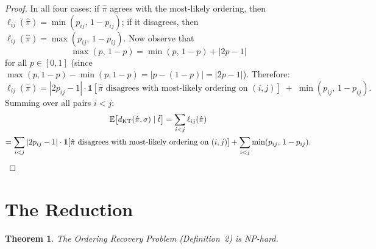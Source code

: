 \documentclass[11pt]{article}
\newtheorem{theorem}[lemma]{Theorem}
\begin{document}
\begin{proof}
In all four cases: if $\hat{\pi}$ agrees with the most-likely ordering, then $\ell_{ij}(\hat{\pi}) = \min(p_{ij},\, 1 - p_{ij})$; if it disagrees, then $\ell_{ij}(\hat{\pi}) = \max(p_{ij},\, 1 - p_{ij})$. Now observe that
\begin{equation}
\max(p,\, 1-p) = \min(p,\, 1-p) + |2p - 1|
\end{equation}
for all $p \in [0,1]$ (since $\max(p, 1-p) - \min(p, 1-p) = |p - (1-p)| = |2p - 1|$). Therefore:
\begin{equation}
\ell_{ij}(\hat{\pi}) = |2p_{ij} - 1| \cdot \mathbf{1}[\hat{\pi} \text{ disagrees with most-likely ordering on } (i,j)] \;+\; \min(p_{ij},\, 1 - p_{ij}).
\end{equation}
Summing over all pairs $i < j$:
\begin{multline}
\mathbb{E}\bigl[d_{\mathrm{KT}}(\hat{\pi}, \sigma) \mid \hat{t}\bigr] = \sum_{i<j} \ell_{ij}(\hat{\pi}) \\
= \sum_{i < j} |2p_{ij} - 1| \cdot \mathbf{1}[\hat{\pi} \text{ disagrees with most-likely ordering on } (i, j)] + \sum_{i<j} \min(p_{ij},\, 1 - p_{ij}). \qedhere
\end{multline}
\end{proof}

\section{The Reduction}

\begin{theorem}
The Ordering Recovery Problem (Definition~2) is NP-hard.
\end{theorem}
\end{document}

